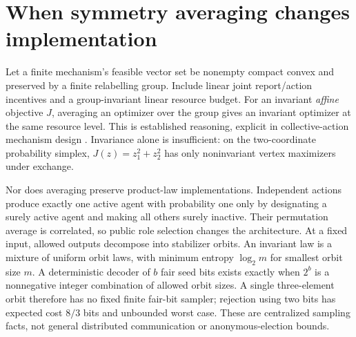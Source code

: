 \section{When symmetry averaging changes implementation}\label{sec:07-phase11-4}
Let a finite mechanism's feasible vector set be nonempty compact convex and
preserved by a finite relabelling group. Include linear joint report/action
incentives and a group-invariant linear resource budget. For an invariant
\emph{affine} objective $J$, averaging an optimizer over the group gives an
invariant optimizer at the same resource level. This is established reasoning,
explicit in collective-action mechanism design \citep{battaglini2024}.
Invariance alone is insufficient: on the two-coordinate probability simplex,
$J(z)=z_1^2+z_2^2$ has only noninvariant vertex maximizers under exchange.

Nor does averaging preserve product-law implementations. Independent actions
produce exactly one active agent with probability one only by designating a
surely active agent and making all others surely inactive. Their permutation
average is correlated, so public role selection changes the architecture.
At a fixed input, allowed outputs decompose into stabilizer orbits. An invariant
law is a mixture of uniform orbit laws, with minimum entropy $\log_2 m$ for
smallest orbit size $m$. A deterministic decoder of $b$ fair seed bits exists
exactly when $2^b$ is a nonnegative integer combination of allowed orbit sizes.
A single three-element orbit therefore has no fixed finite fair-bit sampler;
rejection using two bits has expected cost $8/3$ bits and unbounded worst case.
These are centralized sampling facts, not general distributed communication
or anonymous-election bounds.
